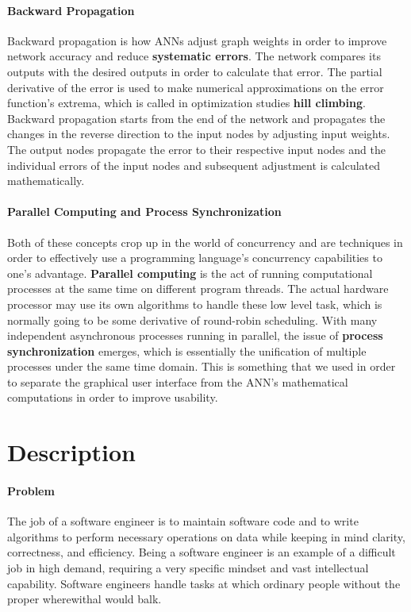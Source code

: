 \documentclass[letterpaper, 10pt]{article}
\begin{document}
	\paragraph{Backward Propagation}
	Backward propagation is how ANNs adjust graph weights in order to improve network accuracy and reduce \textbf{systematic errors}. The network compares its outputs with the desired outputs in order to calculate that error. The partial derivative of the error is used to make numerical approximations on the error function's extrema, which is called in optimization studies \textbf{hill climbing}. Backward propagation starts from the end of the network and propagates the changes in the reverse direction to the input nodes by adjusting input weights. The output nodes propagate the error to their respective input nodes and the individual errors of the input nodes and subsequent adjustment is calculated mathematically.
	\paragraph{Parallel Computing and Process Synchronization}
	Both of these concepts crop up in the world of concurrency and are techniques in order to effectively use a programming language's concurrency capabilities to one's advantage. \textbf{Parallel computing} is the act of running computational processes at the same time on different program threads. The actual hardware processor may use its own algorithms to handle these low level task, which is normally going to be some derivative of round-robin scheduling. With many independent asynchronous processes running in parallel, the issue of \textbf{process synchronization} emerges, which is essentially the unification of multiple processes under the same time domain. This is something that we used in order to separate the graphical user interface from the ANN's mathematical computations in order to improve usability.
	
\cleardoublepage
\section{Description}
	\paragraph{Problem} The job of a software engineer is to maintain software code and to write algorithms to perform necessary operations on data while keeping in mind clarity, correctness, and efficiency. Being a software engineer is an example of a difficult job in high demand, requiring a very specific mindset and vast intellectual capability. Software engineers handle tasks at which ordinary people without the proper wherewithal would balk.
	
\end{document}
